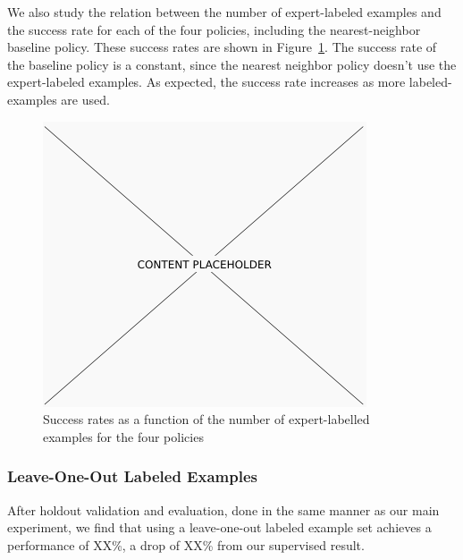 We also study the relation between the number of expert-labeled examples and the success rate for each of the four policies, including the nearest-neighbor baseline policy.
These success rates are shown in Figure~\ref{fig:number_examples}.
The success rate of the baseline policy is a constant, since the nearest neighbor policy doesn't use the expert-labeled examples.
As expected, the success rate increases as more labeled-examples are used.

\begin{figure}[h!]
  \centering
    \includegraphics[width=0.9\linewidth]{figures/placeholder.png}
  \caption{Success rates as a function of the number of expert-labelled examples for the four policies}
  \label{fig:number_examples}
\end{figure}

\subsubsection{Leave-One-Out Labeled Examples}

After holdout validation and evaluation, done in the same manner as our main
experiment, we find that using a leave-one-out labeled example set achieves a
performance of XX\%, a drop of XX\% from our supervised result.
